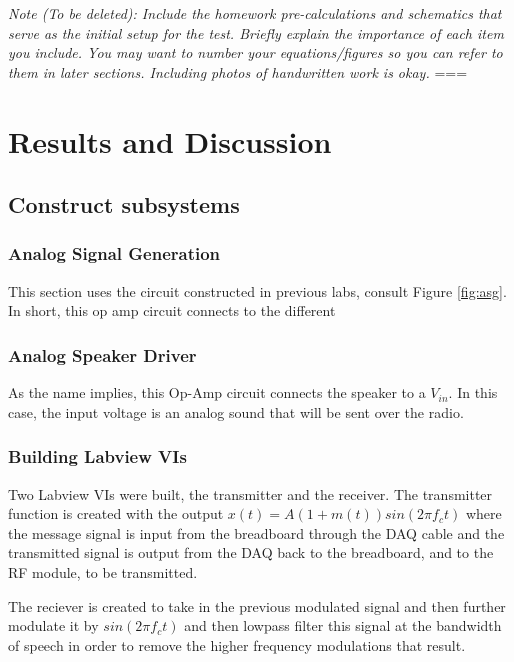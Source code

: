 \documentclass[10pt]{article}
\begin{document}
\medskip

\textit{Note (To be deleted): Include the homework pre-calculations and schematics that serve as the initial setup for the test. Briefly explain the importance of each item you include. You may want to number your equations/figures so you can refer to them in later sections. Including photos of handwritten work is okay.}
===
\section{Results and Discussion}

\subsection{Construct subsystems}

\subsubsection{Analog Signal Generation}

This section uses the circuit constructed in previous labs, consult Figure \ref{fig:asg}. In short, this op amp circuit connects to the different 

\subsubsection{Analog Speaker Driver}

As the name implies, this Op-Amp circuit connects the speaker to a $V_{in}$. In this case, the input voltage is an analog sound that will be sent over the radio. 

\subsubsection{Building Labview VIs}

Two Labview VIs were built, the transmitter and the receiver. The transmitter function is created with the output $x(t)  = A (1 + m(t)) sin(2 \pi f_c t)$ where the message signal is input from the breadboard through the DAQ cable and the transmitted signal is output from the DAQ back to the breadboard, and to the RF module, to be transmitted. 

The reciever is created to take in the previous modulated signal and then further modulate it by $sin(2 \pi f_c t)$ and then lowpass filter this signal at the bandwidth of speech in order to remove the higher frequency modulations that result. 
\end{document}
